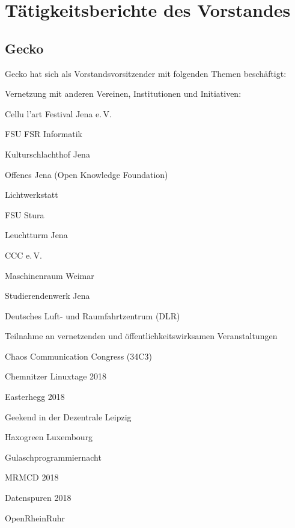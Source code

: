 \documentclass[ngerman]{scrartcl}
\begin{document}
\section{Tätigkeitsberichte des Vorstandes}

\subsection{Gecko}

Gecko hat sich als Vorstandsvorsitzender mit folgenden Themen beschäftigt:

\begin{compactitem}
    \item Vernetzung mit anderen Vereinen, Institutionen und Initiativen:
    \begin{compactitem}
        \item Cellu l'art Festival Jena e.\,V. 
        \item FSU FSR Informatik
        \item Kulturschlachthof Jena
        \item Offenes Jena (Open Knowledge Foundation)
        \item Lichtwerkstatt
        \item FSU Stura
        \item Leuchtturm Jena
        \item CCC e.\,V.
        \item Maschinenraum Weimar
        \item Studierendenwerk Jena
        \item Deutsches Luft- und Raumfahrtzentrum (DLR)
    \end{compactitem}
    \item Teilnahme an vernetzenden und öffentlichkeitswirksamen Veranstaltungen
    \begin{compactitem}
        \item Chaos Communication Congress (34C3)
        \item Chemnitzer Linuxtage 2018
        \item Easterhegg 2018
        \item Geekend in der Dezentrale Leipzig
        \item Haxogreen Luxembourg
        \item Gulaschprogrammiernacht
        \item MRMCD 2018
        \item Datenspuren 2018
        \item OpenRheinRuhr

\end{compactitem}
\end{compactitem}
\end{document}
